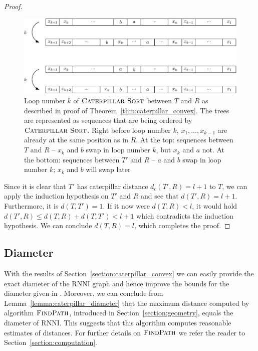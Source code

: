 \documentclass{amsart}
\newcommand{\rnni}{\mathrm{RNNI}}
\newcommand{\csort}{\textsc{Caterpillar Sort}}
\newcommand{\findpath}{\textsc{FindPath}}
\begin{document}
\begin{proof}
    \begin{figure}[H]
    	\centering
    	\includegraphics[width=\textwidth]{cat_convex_seq_example}
    	\caption{Loop number $k$ of $\csort$ between $T$ and $R$ as described in proof of Theorem~\ref{thm:caterpillar_convex}.
        The trees are represented as sequences that are being ordered by $\csort$.
        Right before loop number $k$, $x_1, \ldots, x_{k-1}$ are already at the same position as in $R$.
        At the top: sequences between $T$ and $R$ -- $x_k$ and $b$ swap in loop number $k$, but $x_k$ and $a$ not.
        At the bottom: sequences between $T'$ and $R$ -- $a$ and $b$ swap in loop number $k$; $x_k$ and $b$ will swap later}
    	\label{fig:cat_convex_seq_example}
    \end{figure}

    Since it is clear that $T'$ has caterpillar distance $d_c(T',R) = l+1$ to $T$, we can apply the induction hypothesis on $T'$ and $R$ and see that $d(T',R) = l+1$.
    Furthermore, it is $d(T,T') = 1$.
    If it now were $d(T,R) < l$, it would hold $d(T',R) \leq d(T,R) + d(T,T') < l + 1$ which contradicts the induction hypothesis.
    We can conclude $d(T,R) = l$, which completes the proof.
\end{proof}


\subsection{Diameter}
\label{section:diameter}

With the results of Section~\ref{section:caterpillar_convex} we can easily provide the exact diameter of the $\rnni$ graph and hence improve the bounds for the diameter given in \autocite{Gavryushkin2018-ol}.
Moreover, we can conclude from Lemma~\ref{lemma:caterpillar_diameter} that the maximum distance computed by algorithm $\findpath$, introduced in Section~\ref{section:geometry}, equals the diameter of $\rnni$.
This suggests that this algorithm computes reasonable estimates of distances.
For further details on $\findpath$ we refer the reader to Section~\ref{section:computation}.
\end{document}
